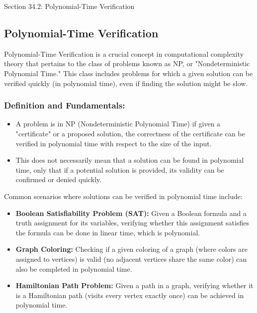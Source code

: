\begin{notes}{Section 34.2: Polynomial-Time Verification}
    \subsection*{Polynomial-Time Verification}

    Polynomial-Time Verification is a crucial concept in computational complexity theory that pertains to the class of problems known as NP, or "Nondeterministic Polynomial Time." This class includes 
    problems for which a given solution can be verified quickly (in polynomial time), even if finding the solution might be slow. \vspace*{1em}
    
    \subsubsection*{Definition and Fundamentals:}
    
    \begin{itemize}
        \item A problem is in NP (Nondeterministic Polynomial Time) if given a "certificate" or a proposed solution, the correctness of the certificate can be verified in polynomial time with respect 
        to the size of the input.
        \item This does not necessarily mean that a solution can be found in polynomial time, only that if a potential solution is provided, its validity can be confirmed or denied quickly.
    \end{itemize}

    \begin{highlight}
        Common scenarios where solutions can be verified in polynomial time include:
        \begin{itemize}
            \item \textbf{Boolean Satisfiability Problem (SAT):} Given a Boolean formula and a truth assignment for its variables, verifying whether this assignment satisfies the formula can be done 
            in linear time, which is polynomial.
            \item \textbf{Graph Coloring:} Checking if a given coloring of a graph (where colors are assigned to vertices) is valid (no adjacent vertices share the same color) can also be completed 
            in polynomial time.
            \item \textbf{Hamiltonian Path Problem:} Given a path in a graph, verifying whether it is a Hamiltonian path (visits every vertex exactly once) can be achieved in polynomial time.
        \end{itemize}
    \end{highlight}
    

\end{notes}
